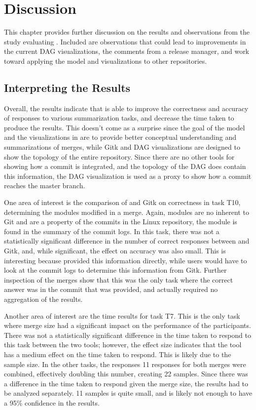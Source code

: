 \chapter{Discussion}\label{cha:discussion}

This chapter provides further discussion on the results and observations
from the study evaluating \tool{}. Included are observations that could
lead to improvements in the current DAG visualizations, the comments
from a release manager, and work toward applying the \mt{} model and
visualizations to other repositories.

\section{Interpreting the Results}\label{sec:interpreting_the_results}

Overall, the results indicate that \tool{} is able to improve the
correctness and accuracy of responses to various summarization tasks,
and decrease the time taken to produce the results. This doesn't come as
a surprise since the goal of the \mt{} model and the visualizations in
\tool{} are to provide better conceptual understanding and
summarizations of merges, while Gitk and DAG visualizations are designed
to show the topology of the entire repository. Since there are no other
tools for showing how a commit is integrated, and the topology of the
DAG does contain this information, the DAG visualization is used as a
proxy to show how a commit reaches the master branch.

One area of interest is the comparison of \tool{} and Gitk on
correctness in task T10, determining the modules modified in a merge.
Again, modules are no inherent to Git and are a property of the commits
in the Linux repository, the module is found in the summary of the
commit logs. In this task, there was not a statistically significant
difference in the number of correct responses between \tool{} and Gitk,
and, while significant, the effect on accuracy was also small. This is
interesting because \tool{} provided this information directly, while
users would have to look at the commit logs to determine this
information from Gitk. Further inspection of the merges show that this
was the only task where the correct answer was in the commit that was
provided, and actually required no aggregation of the results.

Another area of interest are the time results for task T7. This is the
only task where merge size had a significant impact on the performance
of the participants. There was not a statistically significant
difference in the time taken to respond to this task between the two
tools; however, the effect size indicates that the tool has a medium
effect on the time taken to respond. This is likely due to the sample
size. In the other tasks, the responses 11 responses for both merges
were combined, effectively doubling this number, creating 22 samples.
Since there was a difference in the time taken to respond given the
merge size, the results had to be analyzed separately. 11 samples is
quite small, and is likely not enough to have a 95\% confidence in the
results.

